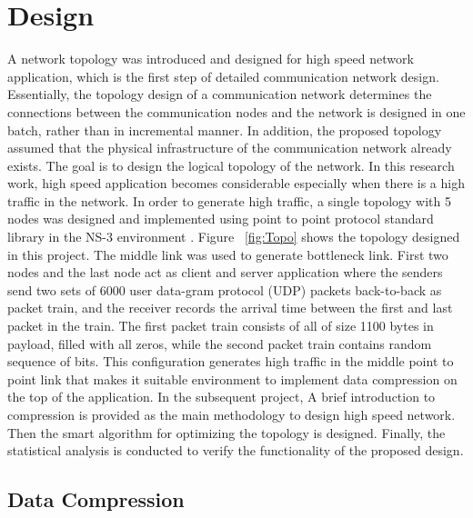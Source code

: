 \documentclass[sigconf]{acmart}
\begin{document}
\section{Design }
A network topology was introduced and designed for high speed network application, which is the first step of detailed communication network design. Essentially, the topology design of a communication network determines the connections between the communication nodes and the network is designed in one batch, rather than in incremental manner. In addition, the proposed topology assumed that the physical infrastructure of the communication network already exists. The goal is to design the logical topology of the network. In this research work, high speed application becomes considerable especially when there is a high traffic in the network. In order to generate high traffic, a single topology with 5 nodes was designed and implemented using point to point protocol \cite{pournaghshband2014end} standard library in the NS-3 environment \cite{zorn1999point} . Figure ~\ref{fig:Topo} shows the topology designed in this project. 
The middle link was used to generate bottleneck link. First two nodes and the last node act as client and server application where the senders send two sets of 6000 user data-gram protocol (UDP) packets back-to-back as packet train, and the receiver records the arrival time between the first and last packet in the train. The first packet train consists of all  of size 1100 bytes in payload, filled with all zeros, while the second packet train contains random sequence of bits. This configuration generates high traffic in the middle point to point link that makes it suitable environment to implement data compression on the top of the application.
In the subsequent project, A brief introduction to compression is provided as the main methodology to design high speed network. Then the smart algorithm for optimizing the topology is designed. Finally, the statistical analysis is conducted to verify the functionality of the proposed design.
 

\subsection{Data Compression}
\end{document}

